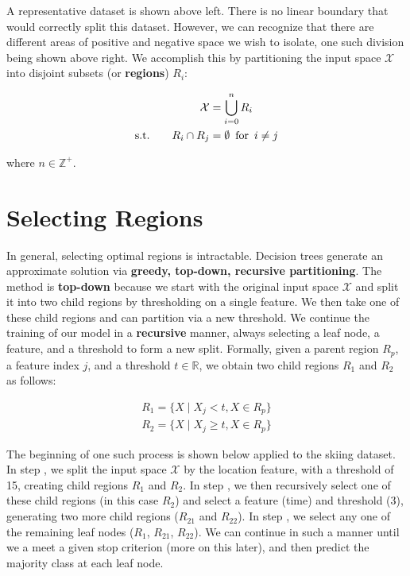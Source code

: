 \documentclass{article}
\begin{document}


A representative dataset is shown above left.  There is no linear boundary that would correctly split this dataset.  However, we can recognize that there are different areas of positive and negative space we wish to isolate, one such division being shown above right.  We accomplish this by partitioning the input space $\mathcal{X}$ into disjoint subsets (or {\bf regions}) $R_i$:

\begin{align*}
\mathcal{X} & = \bigcup\limits_{i=0}^{n} R_i\\
\text{s.t.}\qquad R_i   \cap R_j &= \emptyset \enskip \text{for} \enskip i \neq j
\end{align*}

where $n \in \mathbb{Z}^+$.

\section{Selecting Regions}
\label{Regions}

In general, selecting optimal regions is intractable.  Decision trees generate an approximate solution via {\bf greedy, top-down, recursive partitioning}.  The method is {\bf top-down} because we start with the original input space $\mathcal{X}$ and split it into two child regions by thresholding on a single feature.  We then take one of these child regions and can partition via a new threshold.  We continue the training of our model in a {\bf recursive} manner, always selecting a leaf node, a feature, and a threshold to form a new split.  Formally, given a parent region $R_p$, a feature index $j$, and a threshold $t  \in \mathbb{R}$, we obtain two child regions $R_1$ and $R_2$ as follows:

\begin{align*}
R_1 = \{ X \mid X_j < t, X \in R_p \}\\
R_2 = \{ X \mid X_j \geq t, X \in R_p \}
\end{align*}

The beginning of one such process is shown below applied to the skiing dataset.  In step , we split the input space $\mathcal{X}$ by the location feature, with a threshold of 15, creating child regions $R_1$ and $R_2$.  In step , we then recursively select one of these child regions (in this case $R_2$) and select a feature (time) and threshold ($3$), generating two more child regions ($R_{21}$ and $R_{22}$).  In step , we select any one of the remaining leaf nodes ($R_1$, $R_{21}$, $R_{22}$).  We can continue in such a manner until we a meet a given stop criterion (more on this later), and then predict the majority class at each leaf node. 
\end{document}
